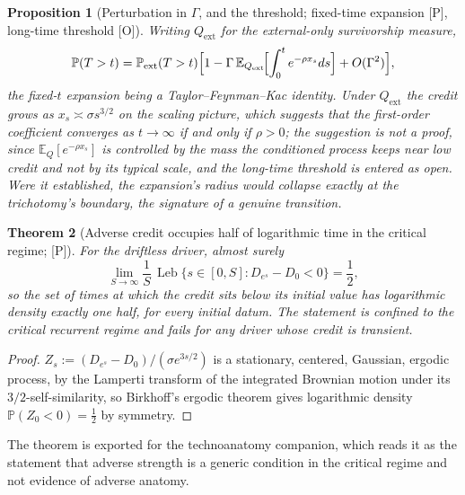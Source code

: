 \documentclass[11pt]{article}
\newtheorem{theorem}{Theorem}[section]
\newtheorem{proposition}[theorem]{Proposition}
\theoremstyle{definition}
\theoremstyle{remark}
\newcommand{\PP}{\mathbb{P}}
\newcommand{\E}{\mathbb{E}}
\DeclareMathOperator{\Leb}{Leb}
\begin{document}
\begin{proposition}[Perturbation in $\Gamma$, and the threshold;
fixed-time expansion {[P]}, long-time threshold {[O]}]\label{prop:perturb}
Writing $Q_{\mathrm{ext}}$ for the external-only survivorship measure,
\begin{equation}\label{eq:perturb}
\PP(T>t)=\PP_{\mathrm{ext}}(T>t)\Bigl[1-\Gamma\,
\E_{Q_{\mathrm{ext}}}\!\Bigl[\int_0^te^{-\rho x_s}ds\Bigr]
+O(\Gamma^{2})\Bigr],
\end{equation}
the fixed-$t$ expansion being a Taylor--Feynman--Kac identity. Under
$Q_{\mathrm{ext}}$ the credit grows as $x_s\asymp\sigma s^{3/2}$ on
the scaling picture, which suggests that the first-order coefficient
converges as $t\to\infty$ if and only if $\rho>0$; the suggestion is
not a proof, since $\E_Q[e^{-\rho x_s}]$ is controlled by the mass the
conditioned process keeps near low credit and not by its typical
scale, and the long-time threshold is entered as open. Were it
established, the expansion's radius would collapse exactly at the
trichotomy's boundary, the signature of a genuine transition.
\end{proposition}

\begin{theorem}[Adverse credit occupies half of logarithmic time in the
critical regime; {[P]}]\label{thm:half}
For the driftless driver, almost surely
\begin{equation}\label{eq:half}
\lim_{S\to\infty}\frac1S\,\Leb\bigl\{s\in[0,S]:D_{e^{s}}-D_0<0\bigr\}=\frac12,
\end{equation}
so the set of times at which the credit sits below its initial value
has logarithmic density exactly one half, for every initial datum. The
statement is confined to the critical recurrent regime and fails for
any driver whose credit is transient.
\end{theorem}

\begin{proof}
$Z_s:=(D_{e^{s}}-D_0)/(\sigma e^{3s/2})$ is a stationary, centered,
Gaussian, ergodic process, by the Lamperti transform of the integrated
Brownian motion under its $3/2$-self-similarity, so Birkhoff's ergodic
theorem gives logarithmic density $\PP(Z_0<0)=\tfrac12$ by symmetry.
\end{proof}

\noindent The theorem is exported for the technoanatomy companion, which
reads it as the statement that adverse strength is a generic condition
in the critical regime and not evidence of adverse anatomy.
\end{document}
